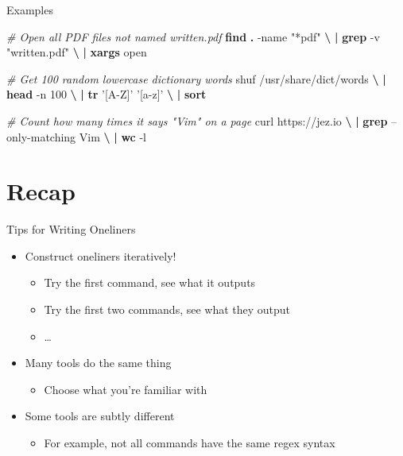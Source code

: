\documentclass[ignorenonframetext,]{beamer}
\newenvironment{Shaded}{}{}
\newcommand{\KeywordTok}[1]{\textcolor[rgb]{0.00,0.44,0.13}{\textbf{{#1}}}}
\newcommand{\StringTok}[1]{\textcolor[rgb]{0.25,0.44,0.63}{{#1}}}
\newcommand{\CommentTok}[1]{\textcolor[rgb]{0.38,0.63,0.69}{\textit{{#1}}}}
\newcommand{\NormalTok}[1]{{#1}}
\providecommand{\tightlist}{%
  \setlength{\itemsep}{0pt}\setlength{\parskip}{0pt}}
\begin{document}
\begin{frame}[fragile]{Examples}

\begin{Shaded}
\begin{Highlighting}[]
\CommentTok{# Open all PDF files not named written.pdf}
\KeywordTok{find} \KeywordTok{.} \NormalTok{-name }\StringTok{"*pdf"} \KeywordTok{\textbackslash{}}
  \KeywordTok{|} \KeywordTok{grep} \NormalTok{-v }\StringTok{"written.pdf"} \KeywordTok{\textbackslash{}}
  \KeywordTok{|} \KeywordTok{xargs} \NormalTok{open}

\CommentTok{# Get 100 random lowercase dictionary words}
\NormalTok{shuf /usr/share/dict/words }\KeywordTok{\textbackslash{}}
  \KeywordTok{|} \KeywordTok{head} \NormalTok{-n 100 }\KeywordTok{\textbackslash{}}
  \KeywordTok{|} \KeywordTok{tr} \StringTok{'[A-Z]'} \StringTok{'[a-z]'} \KeywordTok{\textbackslash{}}
  \KeywordTok{|} \KeywordTok{sort}

\CommentTok{# Count how many times it says "Vim" on a page}
\NormalTok{curl https://jez.io }\KeywordTok{\textbackslash{}}
  \KeywordTok{|} \KeywordTok{grep} \NormalTok{--only-matching Vim }\KeywordTok{\textbackslash{}}
  \KeywordTok{|} \KeywordTok{wc} \NormalTok{-l}
\end{Highlighting}
\end{Shaded}

\end{frame}

\section{Recap}\label{recap}

\begin{frame}{Tips for Writing Oneliners}

\begin{itemize}
\tightlist
\item
  Construct oneliners iteratively!

  \begin{itemize}
  \tightlist
  \item
    Try the first command, see what it outputs
  \item
    Try the first two commands, see what they output
  \item
    \ldots{}
  \end{itemize}
\item
  Many tools do the same thing

  \begin{itemize}
  \tightlist
  \item
    Choose what you're familiar with
  \end{itemize}
\item
  Some tools are subtly different

  \begin{itemize}
  \tightlist
  \item
    For example, not all commands have the same regex syntax
  \end{itemize}
\end{itemize}

\end{frame}
\end{document}
